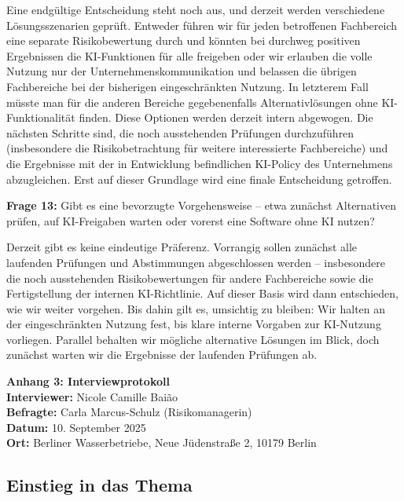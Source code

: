 \documentclass[
    12pt, 
    a4paper,
    ]{scrartcl} %
\begin{document}
Eine endgültige Entscheidung steht noch aus, und derzeit werden verschiedene Lösungsszenarien geprüft. Entweder führen wir für jeden betroffenen Fachbereich eine separate Risikobewertung durch und könnten bei durchweg positiven Ergebnissen die KI-Funktionen für alle freigeben oder wir erlauben die volle Nutzung nur der Unternehmenskommunikation und belassen die übrigen Fachbereiche bei der bisherigen eingeschränkten Nutzung. In letzterem Fall müsste man für die anderen Bereiche gegebenenfalls Alternativlösungen ohne KI-Funktionalität finden. Diese Optionen werden derzeit intern abgewogen. Die nächsten Schritte sind, die noch ausstehenden Prüfungen durchzuführen (insbesondere die Risikobetrachtung für weitere interessierte Fachbereiche) und die Ergebnisse mit der in Entwicklung befindlichen KI-Policy des Unternehmens abzugleichen. Erst auf dieser Grundlage wird eine finale Entscheidung getroffen.  

\textbf{Frage 13:} Gibt es eine bevorzugte Vorgehensweise – etwa zunächst Alternativen prüfen, auf KI-Freigaben warten oder vorerst eine Software ohne KI nutzen?  

Derzeit gibt es keine eindeutige Präferenz. Vorrangig sollen zunächst alle laufenden Prüfungen und Abstimmungen abgeschlossen werden – insbesondere die noch ausstehenden Risikobewertungen für andere Fachbereiche sowie die Fertigstellung der internen KI-Richtlinie. Auf dieser Basis wird dann entschieden, wie wir weiter vorgehen. Bis dahin gilt es, umsichtig zu bleiben: Wir halten an der eingeschränkten Nutzung fest, bis klare interne Vorgaben zur KI-Nutzung vorliegen. Parallel behalten wir mögliche alternative Lösungen im Blick, doch zunächst warten wir die Ergebnisse der laufenden Prüfungen ab.

\newpage
{}
{}
\label{sec:Anhang3}

{\Large\bfseries Anhang 3: Interviewprotokoll}\\[1em]
\textbf{Interviewer:} Nicole Camille Baião \\
\textbf{Befragte:} Carla Marcus-Schulz (Risikomanagerin) \\
\textbf{Datum:} 10. September 2025 \\
\textbf{Ort:} Berliner Wasserbetriebe, Neue Jüdenstraße 2, 10179 Berlin 

\subsection*{Einstieg in das Thema}
\end{document}
